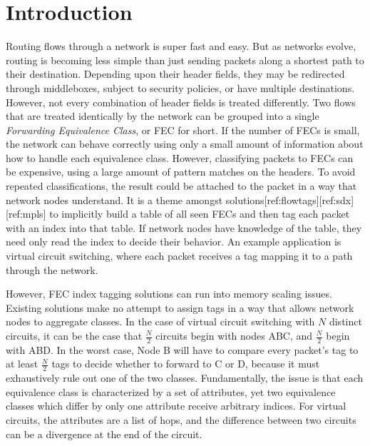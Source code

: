 \section{Introduction}


Routing flows through a network is super fast and easy. But as networks evolve, routing is becoming less simple than just sending packets along a shortest path to their destination. Depending upon their header fields, they may be redirected through middleboxes, subject to security policies, or have multiple destinations. However, not every combination of header fields is treated differently. Two flows that are treated identically by the network can be grouped into a single \textit{Forwarding Equivalence Class}, or FEC for short. If the number of FECs is small, the network can behave correctly using only a small amount of information about how to handle each equivalence class. However, classifying packets to FECs can be expensive, using a large amount of pattern matches on the headers. To avoid repeated classifications, the result could be attached to the packet in a way that network nodes understand. It is a theme amongst solutions[ref:flowtags][ref:sdx][ref:mpls] to implicitly build a table of all seen FECs and then tag each packet with an index into that table. If network nodes have knowledge of the table, they need only read the index to decide their behavior. An example application is virtual circuit switching, where each packet receives a tag mapping it to a path through the network. 


However, FEC index tagging solutions can run into memory scaling issues. 
Existing solutions make no attempt to assign tags in a way that allows network nodes to aggregate classes. In the case of virtual circuit switching with $N$ distinct circuits, it can be the case that $\frac{N}{2}$ circuits begin with nodes ABC, and $\frac{N}{2}$ begin with ABD. In the worst case, Node B will have to compare every packet's tag to at least $\frac{N}{2}$ tags to decide whether to forward to C or D, because it must exhaustively rule out one of the two classes. Fundamentally, the issue is that each equivalence class is characterized by a set of attributes, yet two equivalence classes which differ by only one attribute receive arbitrary indices. For virtual circuits, the attributes are a list of hops, and the difference between two circuits can be a divergence at the end of the circuit.



